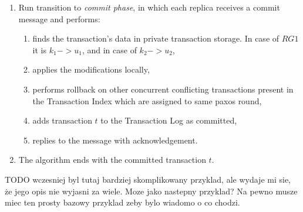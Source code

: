 \begin{enumerate}
\item Run transition to \emph{commit phase}, in which each replica receives a commit message and performs:

	\begin{enumerate}
		\item finds the transaction's data in private transaction storage. In case of $RG1$ it is $k_{1} -> u_{1}$, and in case of $k_{2} -> u_{2}$,
		\item applies the modifications locally,
		\item performs rollback on other concurrent conflicting transactions present in the Transaction Index which are assigned to same paxos round,
		\item adds transaction $t$ to the Transaction Log as committed,
		\item replies to the message with acknowledgement.
	\end{enumerate}

\item The algorithm ends with the committed transaction $t$.

\end{enumerate}

TODO wczesniej byl tutaj bardziej skomplikowany przyklad, ale wydaje mi sie, że jego opis nie wyjasni za wiele.
Moze jako nastepny przyklad? Na pewno musze miec ten prosty bazowy przyklad zeby bylo wiadomo o co chodzi.





